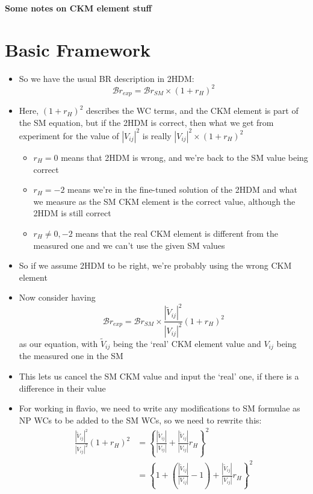 \documentclass[11pt]{article}
\newcommand{\tVVt}{\frac{|\tilde{V}_{ij}|^2}{|V_{ij}|^2}}
\newcommand{\tVV}{\frac{|\tilde{V}_{ij}|}{|V_{ij}|}}
\begin{document}
{\Large\bfseries Some notes on CKM element stuff}
\section{Basic Framework}
\begin{itemize}
    \item So we have the usual BR description in 2HDM:
        \begin{equation*}
            \mathcal{B}r_{exp} = \mathcal{B}r_{SM}\times(1+r_H)^2
        \end{equation*}
    \item Here, $(1+r_H)^2$ describes the WC terms, and the CKM element is part of the SM equation, but if the 2HDM is correct, then what we get from experiment for the value of $|V_{ij}|^2$ is really $|V_{ij}|^2\times(1+r_H)^2$
        \begin{itemize}
            \item $r_H=0$ means that 2HDM is wrong, and we're back to the SM value being correct
            \item $r_H=-2$ means we're in the fine-tuned solution of the 2HDM and what we measure as the SM CKM element is the correct value, although the 2HDM is still correct
            \item $r_H\neq0,-2$ means that the real CKM element is different from the measured one and we can't use the given SM values
        \end{itemize}
    \item So if we assume 2HDM to be right, we're probably using the wrong CKM element
    \item Now consider having
        \begin{equation*}
            \mathcal{B}r_{exp} = \mathcal{B}r_{SM}\times\tVVt(1+r_H)^2
        \end{equation*}
        as our equation, with $\tilde{V}_{ij}$ being the `real' CKM element value and $V_{ij}$ being the measured one in the SM
    \item This lets us cancel the SM CKM value and input the `real' one, if there is a difference in their value
    \item For working in flavio, we need to write any modifications to SM formulae as NP WCs to be added to the SM WCs, so we need to rewrite this:
        \begin{align*}
            \tVVt(1+r_H)^2 &= \left\{\tVV+\tVV r_H\right\}^2 \\
                           &= \left\{1+\left(\tVV-1\right)+\tVV r_H\right\}^2

\end{align*}
\end{itemize}
\end{document}
